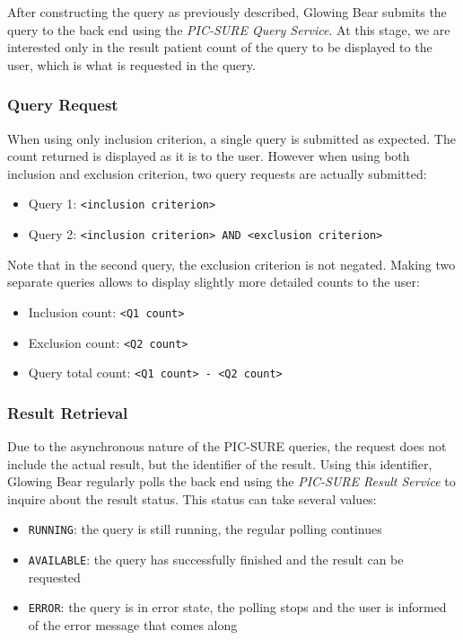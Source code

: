 After constructing the query as previously described, Glowing Bear submits the query to the back end using the \emph{PIC-SURE Query Service}.
At this stage, we are interested only in the result patient count of the query to be displayed to the user, which is what is requested in the query.

\subsubsection{Query Request}
When using only inclusion criterion, a single query is submitted as expected. 
The count returned is displayed as it is to the user.
However when using both inclusion and exclusion criterion, two query requests are actually submitted:
\begin{itemize}
    \setlength\itemsep{0em}

    \item Query 1: \verb|<inclusion criterion>|
    \item Query 2: \verb|<inclusion criterion> AND <exclusion criterion>|
\end{itemize}

Note that in the second query, the exclusion criterion is not negated.
Making two separate queries allows to display slightly more detailed counts to the user:
\begin{itemize}
    \setlength\itemsep{0em}

    \item Inclusion count: \verb|<Q1 count>|
    \item Exclusion count: \verb|<Q2 count>|
    \item Query total count: \verb|<Q1 count> - <Q2 count>|
\end{itemize}


\subsubsection{Result Retrieval}
Due to the asynchronous nature of the PIC-SURE queries, the request does not include the actual result, but the identifier of the result.
Using this identifier, Glowing Bear regularly polls the back end using the \emph{PIC-SURE Result Service} to inquire about the result status.
This status can take several values:
\begin{itemize}
    \setlength\itemsep{0em}

    \item \verb|RUNNING|: the query is still running, the regular polling continues
    \item \verb|AVAILABLE|: the query has successfully finished and the result can be requested
    \item \verb|ERROR|: the query is in error state, the polling stops and the user is informed of the error message that comes along
\end{itemize}

